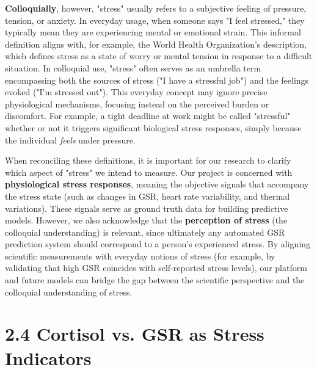 \textbf{Colloquially}, however, "stress" usually refers to a subjective feeling of pressure, tension, or anxiety. In everyday usage, when someone says "I feel stressed," they typically mean they are experiencing mental or emotional strain. This informal definition aligns with, for example, the World Health Organization's description, which defines stress as a state of worry or mental tension in response to a difficult situation\cite{WHOStressDefinition}. In colloquial use, "stress" often serves as an umbrella term encompassing both the sources of stress ("I have a stressful job") and the feelings evoked ("I'm stressed out"). This everyday concept may ignore precise physiological mechanisms, focusing instead on the perceived burden or discomfort. For example, a tight deadline at work might be called "stressful" whether or not it triggers significant biological stress responses, simply because the individual \textit{feels} under pressure.

When reconciling these definitions, it is important for our research to clarify which aspect of "stress" we intend to measure. Our project is concerned with \textbf{physiological stress responses}, meaning the objective signals that accompany the stress state (such as changes in GSR, heart rate variability, and thermal variations). These signals serve as ground truth data for building predictive models. However, we also acknowledge that the \textbf{perception of stress} (the colloquial understanding) is relevant, since ultimately any automated GSR prediction system should correspond to a person's experienced stress. By aligning scientific measurements with everyday notions of stress (for example, by validating that high GSR coincides with self-reported stress levels), our platform and future models can bridge the gap between the scientific perspective and the colloquial understanding of stress.

\section{2.4 Cortisol vs. GSR as Stress Indicators}

